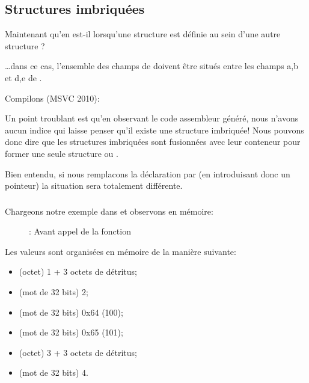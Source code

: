 \subsection{Structures imbriquées}

Maintenant qu'en est-il lorsqu'une structure est définie au sein d'une autre structure ?



\dots dans ce cas, l'ensemble des champs de  doivent être situés entre les champs a,b et 
d,e de .

Compilons (MSVC 2010):



Un point troublant est qu'en observant le code assembleur généré, nous n'avons aucun indice qui laisse penser 
qu'il existe une structure imbriquée!
Nous pouvons donc dire que les structures imbriquées sont fusionnées avec leur conteneur pour former une seule 
structure  ou .

Bien entendu, si nous remplacons la déclaration  par  
(en introduisant donc un pointeur) la situation sera totalement différente.

\clearpage
\subsubsection{\olly}
\myindex{\olly}

Chargeons notre exemple dans \olly et observons  en mémoire:

\begin{figure}[H]
\centering
{}
\caption{\olly: Avant appel de la fonction \printf}
\label{fig:nested_olly}
\end{figure}

Les valeurs sont organisées en mémoire de la manière suivante:
\begin{itemize}
\item {} (octet) 1 + 3 octets de détritus;
\item {} (mot de 32 bits) 2;
\item {} (mot de 32 bits) 0x64 (100);
\item {} (mot de 32 bits) 0x65 (101);
\item {} (octet) 3 + 3 octets de détritus;
\item {} (mot de 32 bits) 4.
\end{itemize}

